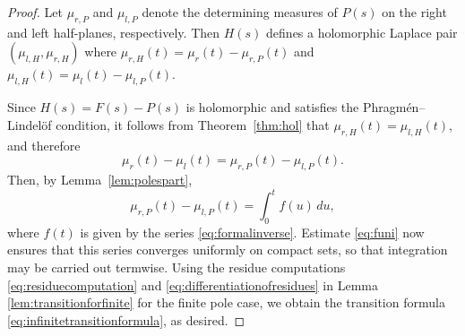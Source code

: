 \documentclass[12pt]{article}
\theoremstyle{definition}
\begin{document}
\begin{proof}
Let $\mu_{r,P}$ and $\mu_{l,P}$ denote the determining measures of $P(s)$ 
on the right and left half-planes, respectively. Then $H(s)$ defines a holomorphic Laplace pair \( (\mu_{l,H}, \mu_{r,H} )\) where
\( \mu_{r,H}(t)=\mu_r(t)-\mu_{r,P}(t) \) and \( \mu_{l,H}(t)=\mu_l(t)-\mu_{l,P}(t).\)

Since $H(s)=F(s)-P(s)$ is holomorphic and satisfies the Phragmén--Lindelöf condition, it follows from
Theorem~\ref{thm:hol} that \( \mu_{r,H}(t)=\mu_{l,H}(t)\), 
and therefore 
\[
\mu_r(t)-\mu_l(t)
=
\mu_{r,P}(t)-\mu_{l,P}(t).
\]
Then, by Lemma~\ref{lem:polespart},
\[
\mu_{r,P}(t)-\mu_{l,P}(t)
=
\int_0^t f(u)\,du,
\]
where $f(t)$ is given by the series  \eqref{eq:formalinverse}.
Estimate \eqref{eq:funi} now ensures that this series converges uniformly on compact sets, so that integration may be carried out termwise. Using the residue computations \eqref{eq:residuecomputation} and \eqref{eq:differentiationofresidues} in Lemma \ref{lem:transitionforfinite} for the finite pole case, we obtain the transition formula
\eqref{eq:infinitetransitionformula}, as desired.
\end{proof}
\end{document}
